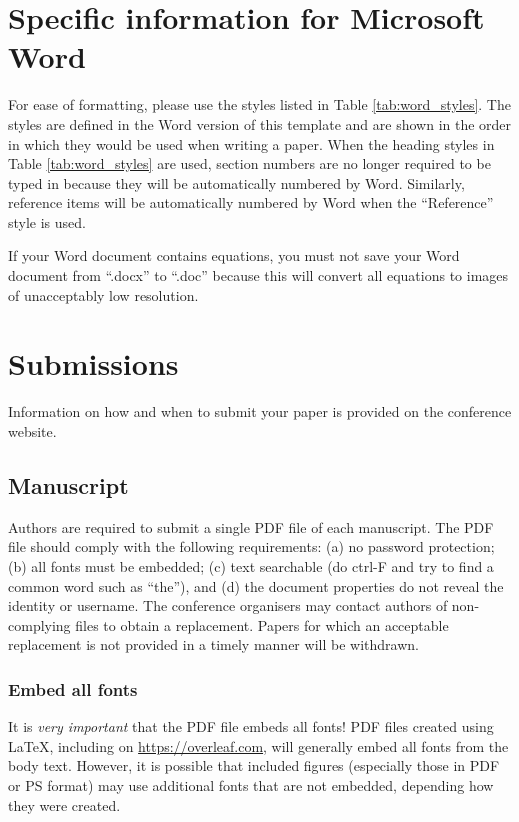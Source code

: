 \documentclass[cameraready]{Interspeech}
\begin{document}
\section{Specific information for Microsoft Word}

For ease of formatting, please use the styles listed in Table \ref{tab:word_styles}. The styles are defined in the Word version of this template and are shown in the order in which they would be used when writing a paper. When the heading styles in Table \ref{tab:word_styles} are used, section numbers are no longer required to be typed in because they will be automatically numbered by Word. Similarly, reference items will be automatically numbered by Word when the ``Reference'' style is used.

If your Word document contains equations, you must not save your Word document from ``.docx'' to ``.doc'' because this will convert all equations to images of unacceptably low resolution.

\section{Submissions}

Information on how and when to submit your paper is provided on the conference website.

\subsection{Manuscript}

Authors are required to submit a single PDF file of each manuscript. The PDF file should comply with the following requirements: (a) no password protection; (b) all fonts must be embedded; (c) text searchable (do ctrl-F and try to find a common word such as ``the''), and (d) the document properties do not reveal the identity or username. The conference organisers may contact authors of non-complying files to obtain a replacement. Papers for which an acceptable replacement is not provided in a timely manner will be withdrawn.

\subsubsection{Embed all fonts}

It is \textit{very important} that the PDF file embeds all fonts!  PDF files created using \LaTeX, including on \url{https://overleaf.com}, will generally embed all fonts from the body text. However, it is possible that included figures (especially those in PDF or PS format) may use additional fonts that are not embedded, depending how they were created.
\end{document}

